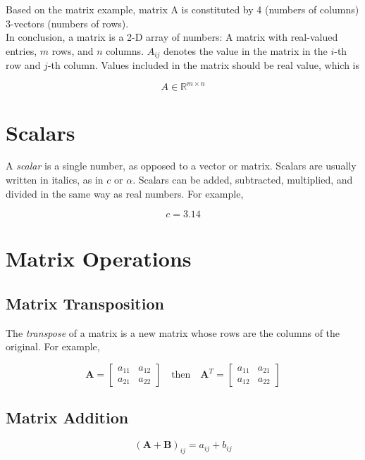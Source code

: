 \documentclass[11pt]{article}
\begin{document}
Based on the matrix example, matrix A is constituted by 4 (numbers of columns) 3-vectors (numbers of rows).  \\

In conclusion, a matrix is a 2-D array of numbers: A matrix with real-valued entries, \( m \) rows, and \( n \) columns.
\( A_{ij} \) denotes the value in the matrix in the \( i \)-th row and \( j \)-th column. Values included in the matrix should 
be real value,  which is 

\[
A \in \mathbb{R}^{m \times n}
\]

\section{Scalars}

A \textit{scalar} is a single number, as opposed to a vector or matrix. Scalars are usually written in italics, as in \( c \) or \( \alpha \).
Scalars can be added, subtracted, multiplied, and divided in the same way as real numbers. For example,

\[
c = 3.14
\]



\section{Matrix Operations}

    \subsection{Matrix Transposition}

    The \textit{transpose} of a matrix is a new matrix whose rows are the columns of the original. For example, 

    \[
\mathbf{A} =
\begin{bmatrix}
a_{11} & a_{12} \\
a_{21} & a_{22}
\end{bmatrix}
\quad \text{then} \quad
\mathbf{A}^T =
\begin{bmatrix}
a_{11} & a_{21} \\
a_{12} & a_{22}
\end{bmatrix}
\]


    \subsection{Matrix Addition}

    \[
(\mathbf{A} + \mathbf{B})_{ij} = a_{ij} + b_{ij}
\]
\end{document}

